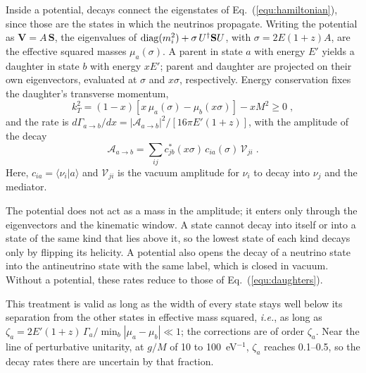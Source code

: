 \documentclass[linenumbers, aps, prd, twocolumn, superscriptaddress, floatfix, longbibliography, nofootinbib, bibnotes]{revtex4-2}
\newcommand{\ie}{{\it i.e.}}
\begin{document}
Inside a potential, decays connect the eigenstates of Eq.~(\ref{equ:hamiltonian}), since those are the states in which the neutrinos propagate.
Writing the potential as $\mathbf{V} = A\, \mathbf{S}$, the eigenvalues of ${\rm diag}(m_i^2) + \sigma\, U^\dagger \mathbf{S} U$, with $\sigma = 2E(1+z) A$, are the effective squared masses $\mu_a(\sigma)$.
A parent in state $a$ with energy $E'$ yields a daughter in state $b$ with energy $xE'$; parent and daughter are projected on their own eigenvectors, evaluated at $\sigma$ and $x\sigma$, respectively.
Energy conservation fixes the daughter's transverse momentum,
\begin{equation}
 \label{equ:window}
 k_T^2 = (1 - x) \left[ x\, \mu_a(\sigma) - \mu_b(x\sigma) \right] - x M^2 \geq 0 \;,
\end{equation}
and the rate is $d\Gamma_{a \to b}/dx = |\mathcal{A}_{a \to b}|^2 / [16\pi E'(1+z)]$, with the amplitude of the decay
\begin{equation}
 \label{equ:medium_amp}
 \mathcal{A}_{a \to b} = \sum_{ij} c^*_{jb}(x\sigma)\, c_{ia}(\sigma)\, \mathcal{V}_{ji} \;.
\end{equation}
Here, $c_{ia} = \langle\nu_i|a\rangle$ and $\mathcal{V}_{ji}$ is the vacuum amplitude for $\nu_i$ to decay into $\nu_j$ and the mediator.

The potential does not act as a mass in the amplitude; it enters only through the eigenvectors and the kinematic window.
A state cannot decay into itself or into a state of the same kind that lies above it, so the lowest state of each kind decays only by flipping its helicity.
A potential also opens the decay of a neutrino state into the antineutrino state with the same label, which is closed in vacuum.
Without a potential, these rates reduce to those of Eq.~(\ref{equ:daughters}).

This treatment is valid as long as the width of every state stays well below its separation from the other states in effective mass squared, \ie, as long as $\zeta_a = 2E'(1+z)\, \Gamma_a / \min_b |\mu_a - \mu_b| \ll 1$; the corrections are of order $\zeta_a$.
Near the line of perturbative unitarity, at $g/M$ of 10 to 100~eV$^{-1}$, $\zeta_a$ reaches 0.1--0.5, so the decay rates there are uncertain by that fraction.
\end{document}
